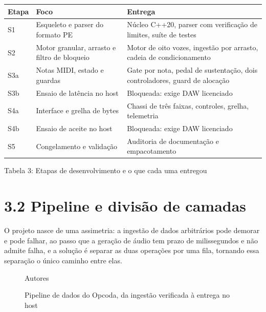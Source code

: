 \documentclass[11pt,a4paper]{article}
\begin{document}
\begin{center}
\scriptsize
\setlength{\tabcolsep}{4pt}
\begin{tabular}{p{}|p{}|p{}}
\hline
\textbf{Etapa} & \textbf{Foco} & \textbf{Entrega} \\
\hline
S1 & Esqueleto e parser do formato PE & Núcleo C++20, parser com verificação de limites, suíte de testes \\
S2 & Motor granular, arrasto e filtro de bloqueio & Motor de oito vozes, ingestão por arrasto, cadeia de condicionamento \\
S3a & Notas MIDI, estado e guardas & Gate por nota, pedal de sustentação, dois controladores, guard de alocação \\
S3b & Ensaio de latência no host & Bloqueada: exige DAW licenciado \\
S4a & Interface e grelha de bytes & Chassi de três faixas, controles, grelha, telemetria \\
S4b & Ensaio de aceite no host & Bloqueada: exige DAW licenciado \\
S5 & Congelamento e validação & Auditoria de documentação e empacotamento \\
\hline
\end{tabular}
\end{center}
\noindent Tabela 3: Etapas de desenvolvimento e o que cada uma entregou\par
\label{tab:3}
\vspace{2pt}{\footnotesize\noindent Autores\par}

\section*{3.2 Pipeline e divisão de camadas}

O projeto nasce de uma assimetria: a ingestão de dados arbitrários pode demorar e pode falhar, ao passo que a geração de áudio tem prazo de milissegundos e não admite falha, e a solução é separar as duas operações por uma fila, tornando essa separação o único caminho entre elas.


\begin{figure}
\centering
\resizebox{0.92\textwidth}{!}{}
\caption{Pipeline de dados do Opcoda, da ingestão verificada à entrega no host}
\label{fig:pipeline}
{\footnotesize Autores\par}
\end{figure}
\end{document}

